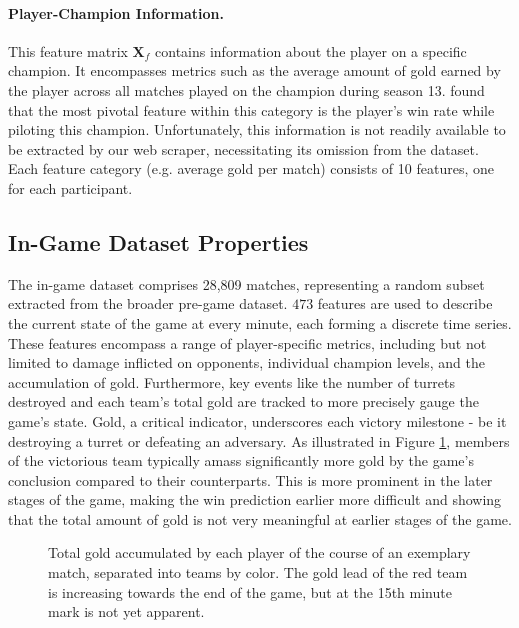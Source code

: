 \documentclass[12pt, a4paper, headinclude, twoside, plainheadsepline, open=right, numbers=noenddot, hidelinks, toc=listof, toc=bibliography]{scrreprt}
\begin{document}
\paragraph{Player-Champion Information.}
This feature matrix $\mathbf{X}_f$ contains information about the player on a specific champion.
It encompasses metrics such as the average amount of gold earned by the player across all matches played on the champion during season 13. 
 \cite{costaFeatureAnalysisLeague2021} found that  the most pivotal feature within this category is the player's win rate while piloting this champion.
Unfortunately, this information is not readily available to be extracted by our web scraper,  necessitating its omission from the dataset.
Each feature category (e.g.  average gold per match) consists of 10 features, one for each participant.

\subsection{In-Game Dataset Properties}
\label{ssec:in_game_data}

The in-game dataset comprises 28,809 matches, representing a random subset extracted from the broader pre-game dataset.
$473$ features are used to describe the current state of the game at every minute, each forming a discrete time series.
These features encompass a range of player-specific metrics, including but not limited to damage inflicted on opponents, individual champion levels, and the accumulation of gold.
Furthermore, key events like the number of turrets destroyed and each team's total gold are tracked to more precisely gauge the game's state. 
Gold, a critical indicator, underscores each victory milestone - be it destroying a turret or defeating an adversary. 
As illustrated in Figure \ref{fig:totalGold}, members of the victorious team typically amass significantly more gold by the game's conclusion compared to their counterparts.
This is more prominent in the later stages of the game, making the win prediction earlier more difficult and showing that the total amount of gold is not very meaningful at earlier stages of the game.

\begin{figure}[htbp]

\caption[Total gold accumulated by each player of the course of an exemplary match]{Total gold accumulated by each player of the course of an exemplary match, separated into teams by color. The gold lead of the red team is increasing towards the end of the game, but at the 15th minute mark is not yet apparent.}
\label{fig:totalGold}
\end{figure}
\end{document}
